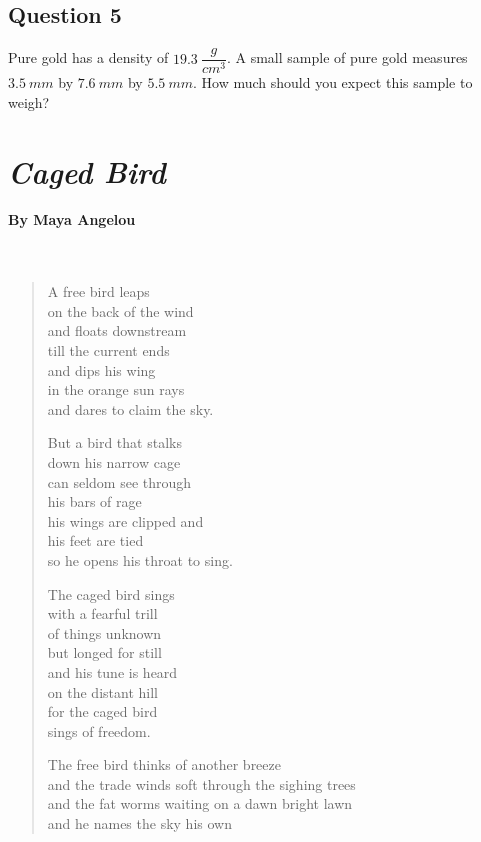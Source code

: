 \documentclass[11pt, letterpaper]{memoir}
\begin{document}
{	\subsection*{Question 5}
	Pure gold has a density of $19.3~\dfrac{g}{cm^3}$. A small sample of pure gold measures $3.5~mm$ by $7.6~mm$ by $5.5~mm$. How much should you expect this sample to weigh?
	
\newpage
\pagestyle{empty}
\addtocounter{page}{-1}
	\section*{\emph{Caged Bird}}
	\paragraph{By Maya Angelou}~
	\begin{verse}
		A free bird leaps\\
		on the back of the wind\\
		and floats downstream\\ 
		till the current ends\\
		and dips his wing\\
		in the orange sun rays\\
		and dares to claim the sky.
		
		But a bird that stalks\\
		down his narrow cage\\
		can seldom see through\\
		his bars of rage\\
		his wings are clipped and\\
		his feet are tied\\
		so he opens his throat to sing.
		
		The caged bird sings\\
		with a fearful trill\\ 
		of things unknown\\
		but longed for still\\
		and his tune is heard\\
		on the distant hill\\
		for the caged bird\\
		sings of freedom.
		
		The free bird thinks of another breeze\\
		and the trade winds soft through the sighing trees\\
		and the fat worms waiting on a dawn bright lawn\\
		and he names the sky his own
		

\end{verse}}
\end{document}
